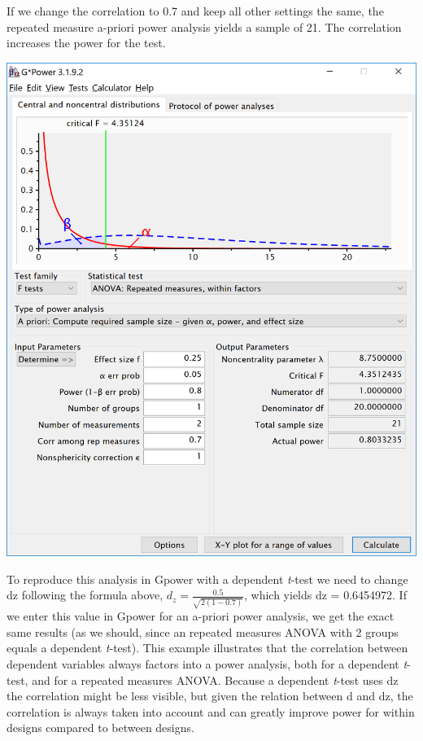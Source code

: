 \documentclass[
]{book}
\begin{document}
\newpage

If we change the correlation to 0.7 and keep all other settings the same, the repeated measure a-priori power analysis yields a sample of 21. The correlation increases the power for the test.

\includegraphics{screenshots/gpower_11.png}

\newpage

To reproduce this analysis in Gpower with a dependent \emph{t}-test we need to change dz following the formula above, \(d_{z}=\frac{0.5}{\sqrt{2(1-0.7)}}\), which yields dz = 0.6454972. If we enter this value in Gpower for an a-priori power analysis, we get the exact same results (as we should, since an repeated measures ANOVA with 2 groups equals a dependent \emph{t}-test). This example illustrates that the correlation between dependent variables always factors into a power analysis, both for a dependent \emph{t}-test, and for a repeated measures ANOVA. Because a dependent \emph{t}-test uses dz the correlation might be less visible, but given the relation between d and dz, the correlation is always taken into account and can greatly improve power for within designs compared to between designs.
\end{document}
